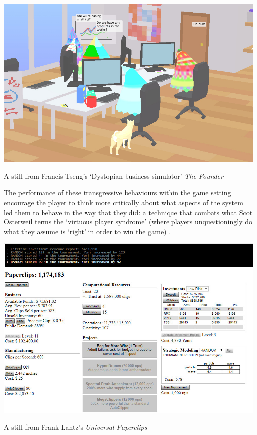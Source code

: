 \documentclass[nofonts,nols,justified,nobib]{tufte-book}
\begin{document}
\begin{marginfigure}
\includegraphics[width=\textwidth]{img/1/the-founder.jpg}
\caption{A still from Francis Tseng's `Dystopian business simulator' \emph{The Founder} \cite{tseng_founder_2017-1}}
\end{marginfigure}

The performance of these transgressive behaviours within the game setting encourage the player to think more critically about what aspects of the system led them to behave in the way that they did: a technique that combats what Scot Osterweil terms the `virtuous player syndrome' (where players unquestioningly do what they assume is `right' in order to win the game) \cite{osterweil_civic_2011}.

\begin{marginfigure}
\includegraphics[width=\textwidth]{img/1/universal-paperclips-progress.jpg}
\caption{A still from Frank Lantz's \emph{Universal Paperclips} \cite{lantz_universal_2017}}
\end{marginfigure}
\end{document}
